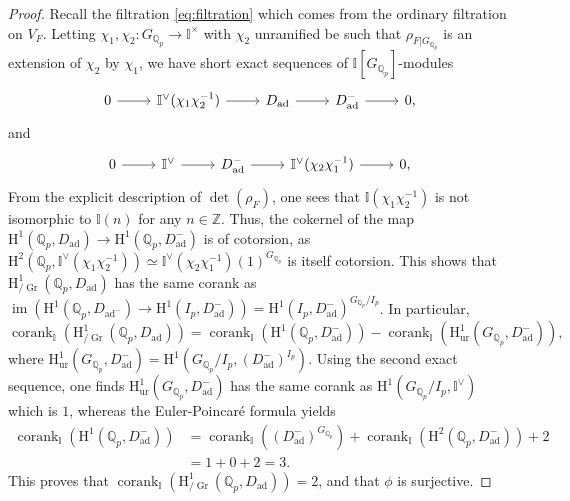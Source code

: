 \documentclass[12pt]{amsart}
\newcommand\bI{\mathbb{I}}
\newcommand\bZ{\mathbb{Z}}
\newcommand\bQ{\mathbb{Q}}
\newcommand\Qp{{\mathbb{Q}_p}}
\DeclareMathOperator{\im}{im}
\DeclareMathOperator{\ad}{ad}
\DeclareMathOperator{\Gr}{Gr}
\DeclareMathOperator{\corank}{corank}
\newcommand{\HH}{\mathrm{H}}
\newcommand{\ur}{\mathrm{ur}}
\theoremstyle{defstyle}
\theoremstyle{thmstyle}
\begin{document}
\begin{proof}
Recall the filtration \eqref{eq:filtration} which comes from the ordinary filtration on $V_F$. Letting $\chi_1,\chi_2\colon G_{\Qp} \to \bI^\times$ with $\chi_2$ unramified be such that $\rho_{F|G_{\Qp}}$ is an extension of $\chi_2$ by $\chi_1$, we have short exact sequences of $\bI[G_{\Qp}]$-modules
\[\begin{tikzcd}
	0 \rar & \bI^\vee(\chi_1\chi_2^{-1}) \rar & D_{\ad} \rar & D_{\ad}^- \rar & 0, 
\end{tikzcd}\]
and
\[\begin{tikzcd}
	0 \rar & \bI^\vee \rar & D_{\ad}^- \rar & \bI^\vee(\chi_2\chi_1^{-1}) \rar & 0,
\end{tikzcd}\]
From the explicit description of $\det(\rho_F)$, one sees that $\bI(\chi_1\chi_2^{-1})$ is not isomorphic to $\bI(n)$ for any $n\in\bZ$. Thus, the cokernel of the map $\HH^1(\Qp,D_{\ad}) \to \HH^1(\Qp,D_{\ad}^-)$ is of cotorsion, as $\HH^2(\Qp,\bI^\vee(\chi_1\chi_2^{-1}))\simeq\bI^\vee(\chi_2\chi_1^{-1})(1)^{G_{\Qp}}$ is itself cotorsion. This shows that $\HH^1_{\slash\Gr}(\Qp,D_{\ad})$ has the same corank as $\im(\HH^1(\Qp,D_{\ad^-})\to\HH^1(I_p,D^-_{\ad}))=\HH^1(I_p,D^-_{\ad})^{G_{\Qp}/I_p}$. In particular,
\small\[\corank_{\bI}(\HH^1_{\slash\Gr}(\Qp,D_{\ad}))=\corank_{\bI}(\HH^1(\bQ_p,D^-_{\ad}))-\corank_{\bI}(\HH^1_\ur(G_{\Qp},D^-_{\ad})),\]\normalsize
where $\HH^1_\ur(G_{\Qp},D^-_{\ad})=\HH^1(G_{\Qp}/I_p,(D^-_{\ad})^{I_p})$. Using the second exact sequence, one finds $\HH^1_\ur(G_{\Qp},D^-_{\ad})$ has the same corank as $\HH^1(G_{\Qp}/I_p,\bI^\vee)$ which is $1$, whereas the Euler-Poincaré formula yields
\small
\begin{align*}
\corank_{\bI}(\HH^1(\bQ_p,D^-_{\ad}))&=\corank_{\bI}((D^-_{\ad})^{G_{\Qp}})+\corank_{\bI}(\HH^2(\Qp,D^-_{\ad}))+2 \\ &=1+0+2=3.
\end{align*}
\normalsize
This proves that $\corank_{\bI}(\HH^1_{\slash\Gr}(\Qp,D_{\ad}))=2$, and that $\phi$ is surjective.
\end{proof}
\end{document}

